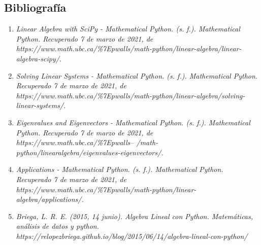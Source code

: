\documentclass[12pt]{article}
\begin{document}
\begin{enumerate}


\section{Bibliografía}
\begin{enumerate}
\item \textit{Linear Algebra with SciPy - Mathematical Python. (s. f.). Mathematical Python. Recuperado 7 de marzo de 2021, de https://www.math.ubc.ca/\%7Epwalls/math-python/linear-algebra/linear-algebra-scipy/.}

\item \textit{Solving Linear Systems - Mathematical Python. (s. f.). Mathematical Python. Recuperado 7 de marzo de 2021, de https://www.math.ubc.ca/\%7Epwalls/math-python/linear-algebra/solving-linear-systems/.}

\item \textit{Eigenvalues and Eigenvectors - Mathematical Python. (s. f.). Mathematical Python. Recuperado 7 de marzo de 2021, de https://www.math.ubc.ca/\%7Epwalls-- /math-python/linearalgebra/eigenvalues-eigenvectors/.}

\item \textit{Applications - Mathematical Python. (s. f.). Mathematical Python. Recuperado 7 de marzo de 2021, de https://www.math.ubc.ca/\%7Epwalls/math-python/linear-algebra/applications/.}

\item \textit{Briega, L. R. E. (2015, 14 junio). Algebra Lineal con Python. Matemáticas, análisis de datos y python. https://relopezbriega.github.io/blog/2015/06/14/algebra-lineal-con-python/}
   
 \end{enumerate}
\end{enumerate}


\end{document}
